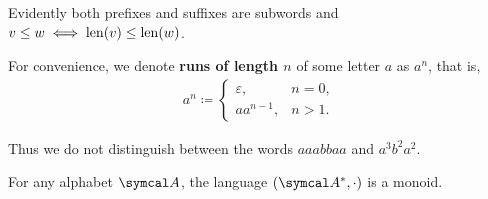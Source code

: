 \begin{definition}
  Evidently both prefixes and suffixes are subwords and \( v \leq w \iff \operatorname{len}(v) \leq \operatorname{len}(w) \).

  For convenience, we denote \textbf{runs of length \( n \)} of some letter \( a \) as \( a^n \), that is,
  \begin{align*}
    a^n \coloneqq \begin{cases}
      \varepsilon, &n = 0, \\
      a a^{n-1}, &n > 1.
    \end{cases}
  \end{align*}

  Thus we do not distinguish between the words \( aaabbaa \) and \( a^3 b^2 a^2 \).
\end{definition}

\begin{proposition}\label{thm:set_of_all_words_is_monoid}
  For any alphabet \( \Cal{A} \), the language \( (\Cal{A}^{*}, \cdot) \) is a monoid.
\end{proposition}
